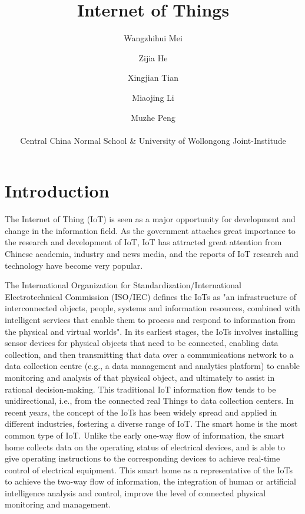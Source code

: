 \documentclass[a4paper,11pt]{article}
\begin{document}
\title{Internet of Things}
\author{Wangzhihui Mei \and Zijia He \and Xingjian Tian \and Miaojing Li \and Muzhe Peng \\ \\
Central China Normal School \& 
University of Wollongong Joint-Institude}

\date{}
\maketitle
\thispagestyle{empty}
\clearpage


\newpage
\setcounter{page}{1} %

\section{Introduction}
The Internet of Thing (IoT) is seen as a major opportunity for development and change in the information field. As the government attaches great importance to the research and development of IoT, IoT has attracted great attention from Chinese academia, industry and news media, and the reports of IoT research and technology have become very popular\cite{dong2017understanding}.

The International Organization for Standardization/International Electrotechnical Commission (ISO/IEC) defines the IoTs as "an infrastructure of interconnected objects, people, systems and information resources, combined with intelligent services that enable them to process and respond to information from the physical and virtual worlds"\cite{iotdef}. In its earliest stages, the IoTs involves installing sensor devices for physical objects that need to be connected, enabling data collection, and then transmitting that data over a communications network to a data collection centre (e.g., a data management and analytics platform) to enable monitoring and analysis of that physical object, and ultimately to assist in rational decision-making. This traditional IoT information flow tends to be unidirectional, i.e., from the connected real Things to data collection centers. In recent years, the concept of the IoTs has been widely spread and applied in different industries, fostering a diverse range of IoT\cite{salman2018iot}. The smart home is the most common type of IoT. Unlike the early one-way flow of information, the smart home collects data on the operating status of electrical devices, and is able to give operating instructions to the corresponding devices to achieve real-time control of electrical equipment. This smart home as a representative of the IoTs to achieve the two-way flow of information, the integration of human or artificial intelligence analysis and control, improve the level of connected physical monitoring and management.
\end{document}
